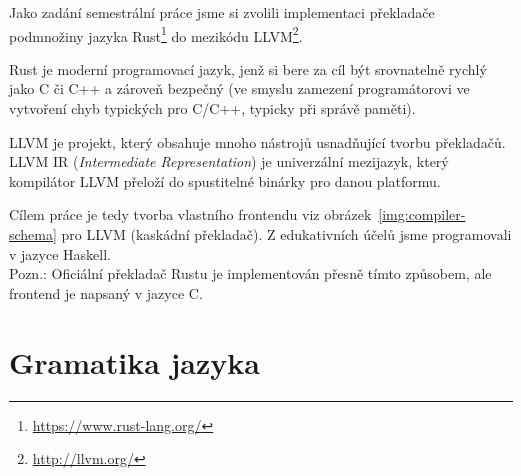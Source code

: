 \documentclass[12pt,a4paper]{article}
\begin{document}
Jako zadání semestrální práce jsme si zvolili implementaci překladače podmnožiny jazyka Rust\footnote{\url{https://www.rust-lang.org/}} do mezikódu LLVM\footnote{\url{http://llvm.org/}}. 

Rust je moderní programovací jazyk, jenž si bere za cíl být srovnatelně rychlý jako C či C++ a zároveň bezpečný (ve smyslu zamezení programátorovi ve vytvoření chyb typických pro C/C++, typicky při správě paměti).

LLVM je projekt, který obsahuje mnoho nástrojů usnadňující tvorbu překladačů. LLVM IR (\textit{Intermediate Representation}) je univerzální mezijazyk, který kompilátor LLVM přeloží do spustitelné binárky pro danou platformu.

Cílem práce je tedy tvorba vlastního frontendu viz obrázek~\ref{img:compiler-schema} pro LLVM (kaskádní překladač). Z edukativních účelů jsme programovali v jazyce Haskell.\\

Pozn.: Oficiální překladač Rustu je implementován přesně tímto způsobem, ale frontend je napsaný v jazyce C.


\section{Gramatika jazyka}

\setlength{\grammarparsep}{20pt plus 1pt minus 1pt} %
\setlength{\grammarindent}{12em} %
\end{document}
